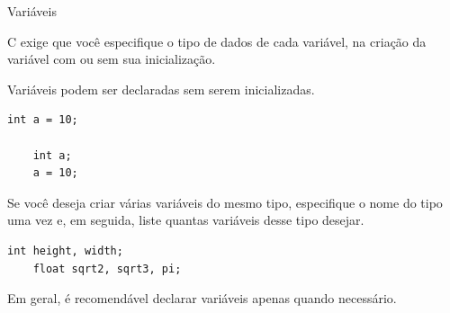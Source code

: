 \documentclass{beamer}
\begin{document}
\begin{frame}{Variáveis}

  C exige que você especifique o tipo de dados de cada variável, na
  criação da variável com ou sem sua inicialização.

  Variáveis podem ser declaradas sem serem inicializadas. 

  \begin{lstlisting}[style=normalc]
    int a = 10; 

    int a;    
    a = 10;   
  \end{lstlisting}

  \framebreak

  Se você deseja criar várias variáveis do mesmo tipo, especifique o
  nome do tipo uma vez e, em seguida, liste quantas variáveis desse
  tipo desejar.

  \begin{lstlisting}[style=normalc]
    int height, width;
    float sqrt2, sqrt3, pi;
  \end{lstlisting}
  
  Em geral, é recomendável declarar variáveis apenas quando necessário.

\end{frame}
\end{document}
